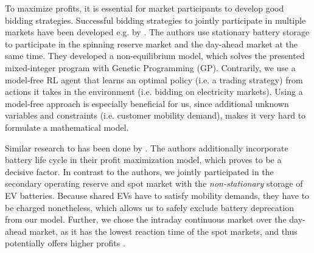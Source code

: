 \documentclass[12pt, article]{article}
\begin{document}
To maximize profits, it is essential for market participants to develop good
bidding strategies. Successful bidding strategies to jointly participate in
multiple markets have been developed e.g. by
\textcite{mashhour11_biddin_strat_virtual_power_plant_2}. The authors use
stationary battery storage to participate in the spinning reserve market and
the day-ahead market at the same time. They developed a non-equilibrium model,
which solves the presented mixed-integer program with Genetic Programming (GP).
Contrarily, we use a model-free RL agent that learns an optimal policy (i.e.
a trading strategy) from actions it takes in the environment (i.e. bidding on
electricity markets). Using a model-free approach is especially beneficial for
us, since additional unknown variables and constraints (i.e. customer mobility
demand), makes it very hard to formulate a mathematical model.

Similar research to \textcite{mashhour11_biddin_strat_virtual_power_plant_2} has
been done by \textcite{he16_optim_biddin_strat_batter_storag}. The authors
additionally incorporate battery life cycle in their profit maximization model,
which proves to be a decisive factor. In contrast to the authors, we jointly
participated in the secondary operating reserve and spot market with the
\emph{non-stationary} storage of EV batteries. Because shared EVs have to satisfy
mobility demands, they have to be charged nonetheless, which allows us to safely
exclude battery deprecation from our model. Further, we chose the intraday
continuous market over the day-ahead market, as it has the lowest reaction time
of the spot markets, and thus potentially offers higher profits
\parencite{tomic07_using_fleet_elect_drive_vehic_grid_suppor}.
\end{document}
